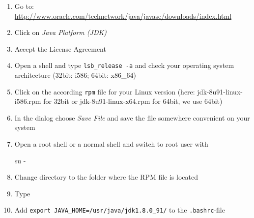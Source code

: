 \begin{enumerate}[noitemsep]
 \item Go to: \href{http://www.oracle.com/technetwork/java/javase/downloads/index.html}{http://www.oracle.com/technetwork/java/javase/downloads/index.html}
 \item Click on \textit{Java Platform (JDK)}
 \item Accept the License Agreement
 \item Open a shell and type \lstinline[style=inlinecodestyle]+lsb_release -a+ and check your operating system architecture (32bit: i586; 64bit: x86\_64)
 \item Click on the according \verb+rpm+ file for your Linux version (here: jdk-8u91-linux-i586.rpm for 32bit or jdk-8u91-linux-x64.rpm for 64bit, we use 64bit)
 \item In the dialog choose \textit{Save File} and save the file somewhere convenient on your system
 \item Open a root shell or a normal shell and switch to root user with
\begin{code}
su -
\end{code}
 \item Change directory to the folder where the RPM file is located
 \item Type
\begingroup
\lstset{breaklines = true}
\endgroup
 \item Add \lstinline[style=inlinecodestyle]+export JAVA_HOME=/usr/java/jdk1.8.0_91/+ to the \verb+.bashrc+-file
\end{enumerate}


